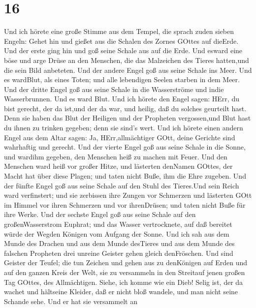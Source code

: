 \hypertarget{section-14}{%
\section{16}\label{section-14}}

 Und ich hörete eine große Stimme aus dem Tempel, die sprach
zuden sieben Engeln: Gehet hin und gießet aus die Schalen des Zornes
GOttes auf dieErde.  Und der erste ging hin und goß seine
Schale aus auf die Erde. Und esward eine böse und arge Drüse an den
Menschen, die das Malzeichen des Tieres hatten,und die sein Bild
anbeteten.  Und der andere Engel goß aus seine Schale ins
Meer. Und es wardBlut, als eines Toten; und alle lebendigen Seelen
starben in dem Meer.  Und der dritte Engel goß aus seine
Schale in die Wasserströme und indie Wasserbrunnen. Und es ward Blut.
 Und ich hörete den Engel sagen: HErr, du bist gerecht, der
da ist,und der da war, und heilig, daß du solches geurteilt hast.
 Denn sie haben das Blut der Heiligen und der Propheten
vergossen,und Blut hast du ihnen zu trinken gegeben; denn sie sind's
wert.  Und ich hörete einen andern Engel aus dem Altar
sagen: Ja, HErr,allmächtiger GOtt, deine Gerichte sind wahrhaftig und
gerecht.  Und der vierte Engel goß aus seine Schale in die
Sonne, und wardihm gegeben, den Menschen heiß zu machen mit Feuer.
 Und den Menschen ward heiß vor großer Hitze, und lästerten
denNamen GOttes, der Macht hat über diese Plagen; und taten nicht Buße,
ihm die Ehre zugeben.  Und der fünfte Engel goß aus seine
Schale auf den Stuhl des Tieres.Und sein Reich ward verfinstert; und sie
zerbissen ihre Zungen vor Schmerzen  und lästerten GOtt im
Himmel vor ihren Schmerzen und vor ihrenDrüsen; und taten nicht Buße für
ihre Werke.  Und der sechste Engel goß aus seine Schale auf
den großenWasserstrom Euphrat; und das Wasser vertrocknete, auf daß
bereitet würde der Wegden Königen vom Aufgang der Sonne. 
Und ich sah aus dem Munde des Drachen und aus dem Munde desTieres und
aus dem Munde des falschen Propheten drei unreine Geister gehen gleich
denFröschen.  Und sind Geister der Teufel; die tun Zeichen
und gehen aus zu denKönigen auf Erden und auf den ganzen Kreis der Welt,
sie zu versammeln in den Streitauf jenen großen Tag GOttes, des
Allmächtigen.  Siehe, ich komme wie ein Dieb! Selig ist,
der da wachet und hältseine Kleider, daß er nicht bloß wandele, und man
nicht seine Schande sehe.  Und er hat sie versammelt an
